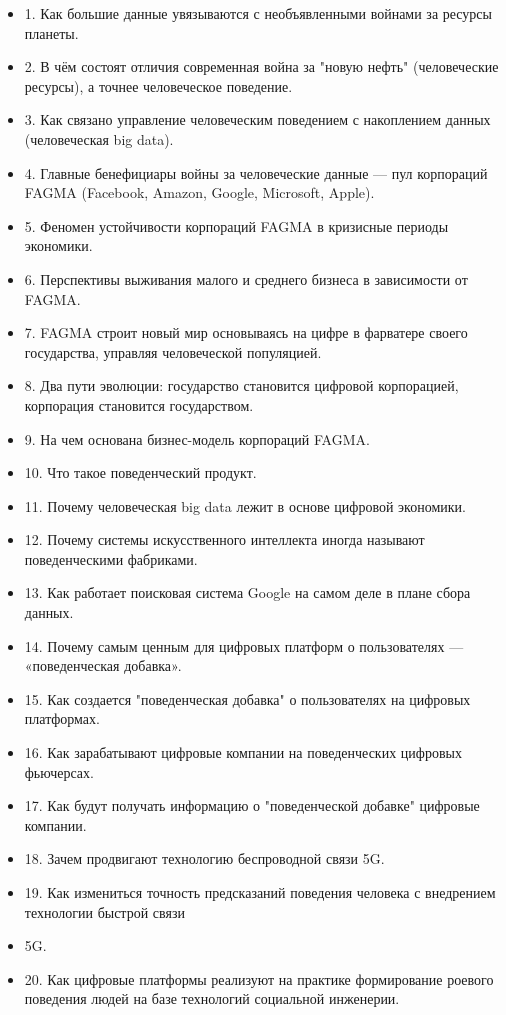 \documentclass[a4paper,11pt]{extreport}
\begin{document}
\begin{itemize}
\item 1. Как большие данные увязываются с необъявленными войнами за ресурсы планеты.
\item 2. В чём состоят отличия современная война за "новую нефть" (человеческие ресурсы), а точнее человеческое поведение.
\item 3. Как связано управление человеческим поведением с накоплением данных (человеческая big data).
\item 4. Главные бенефициары войны за человеческие данные --- пул корпораций FAGMA (Facebook, Amazon, Google, Microsoft, Apple).
\item 5. Феномен устойчивости корпораций FAGMA в кризисные периоды экономики.
\item 6. Перспективы выживания малого и среднего бизнеса в зависимости от FAGMA.
\item 7. FAGMA строит новый мир основываясь на цифре в фарватере своего государства, управляя человеческой популяцией.
\item 8. Два пути эволюции: государство становится цифровой корпорацией, корпорация становится государством.
\item 9. На чем основана бизнес-модель корпораций FAGMA.
\item 10. Что такое поведенческий продукт.
\item 11. Почему человеческая big data лежит в основе цифровой экономики.
\item 12. Почему системы искусственного интеллекта иногда называют поведенческими фабриками.
\item 13. Как работает поисковая система Google на самом деле в плане сбора данных.
\item 14. Почему самым ценным для цифровых платформ о пользователях --- «поведенческая добавка».
\item 15. Как создается "поведенческая добавка" о пользователях на цифровых платформах.
\item 16. Как зарабатывают цифровые компании на поведенческих цифровых фьючерсах.
\item 17. Как будут получать информацию о "поведенческой добавке" цифровые компании.
\item 18. Зачем продвигают технологию беспроводной связи 5G.
\item 19. Как измениться точность предсказаний поведения человека с внедрением технологии быстрой связи \item 5G.
\item 20. Как цифровые платформы реализуют на практике формирование роевого поведения людей на базе технологий социальной инженерии.

\end{itemize}
\end{document}
